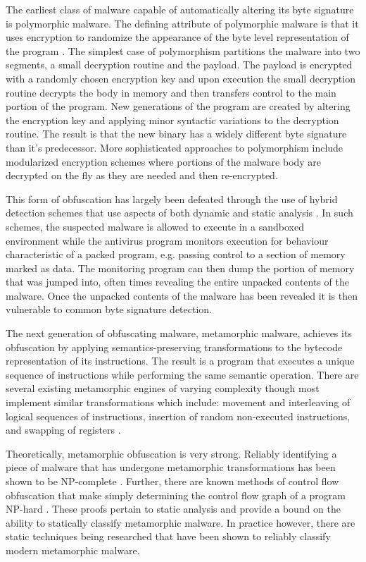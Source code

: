     The earliest class of malware capable of automatically altering its byte
    signature is polymorphic malware. The defining attribute of polymorphic
    malware is that it uses encryption to randomize the appearance of the byte
    level representation of the program \cite{simile}. The simplest case of
    polymorphism partitions the malware into two segments, a small decryption
    routine and the payload. The payload is encrypted with a randomly chosen
    encryption key and upon execution the small decryption routine decrypts the
    body in memory and then transfers control to the main portion of the
    program. New generations of the program are created by altering the
    encryption key and applying minor syntactic variations to the decryption
    routine. The result is that the new binary has a widely different byte
    signature than it's predecessor. More sophisticated approaches to
    polymorphism include modularized encryption schemes where portions of the
    malware body are decrypted on the fly as they are needed and then
    re-encrypted.

    This form of obfuscation has largely been defeated through the use of hybrid
    detection schemes that use aspects of both dynamic and static analysis
    \cite{polyunpack,omniunpack,renovo}. In such schemes, the suspected malware
    is allowed to execute in a sandboxed environment while the antivirus
    program monitors execution for behaviour characteristic of a packed program,
    e.g. passing control to a section of memory marked as data. The monitoring
    program can then dump the portion of memory that was jumped into, often
    times revealing the entire unpacked contents of the malware. Once the
    unpacked contents of the malware has been revealed it is then vulnerable to
    common byte signature
    detection.

    The next generation of obfuscating malware, metamorphic malware, achieves
    its obfuscation by applying semantics-preserving transformations to the
    bytecode representation of its instructions. The result is a program that
    executes a unique sequence of instructions while performing the same
    semantic operation. There are several existing metamorphic engines of
    varying complexity though most implement similar transformations which
    include: movement and interleaving of logical sequences of instructions,
    insertion of random non-executed instructions, and swapping of registers
    \cite{simile}. 

    Theoretically, metamorphic obfuscation is very strong. Reliably identifying
    a piece of malware that has undergone metamorphic transformations has been
    shown to be NP-complete \cite{npcomplete}. Further, there are known methods
    of control flow obfuscation that make simply determining the control flow
    graph of a program NP-hard \cite{controlflow}. These proofs pertain to
    static analysis and provide a bound on the ability to statically classify
    metamorphic malware. In practice however, there are static techniques being
    researched that have been shown to reliably classify modern metamorphic
    malware.

